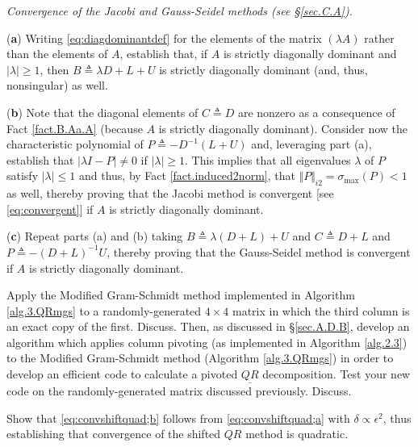 \begin{exercise} \label{ex.4.Jacobi.Gauss-Seidel} \rm {\it Convergence of the Jacobi and Gauss-Seidel methods (see \S \ref{sec.C.A}).}\vskip0.05in

\noindent ({\bf a}) Writing \eqref{eq:diagdominantdef} for the elements of the matrix $(\lambda A)$ rather than the elements of $A$,
establish that, if $A$ is strictly diagonally dominant and
$|\lambda|\ge 1$, then $B\triangleq \lambda D+L+U$ is strictly diagonally dominant (and, thus, nonsingular) as well.\vskip0.1in

\noindent ({\bf b}) Note that the diagonal elements of $C\triangleq D$ are nonzero as a consequence of Fact \ref{fact.B.Aa.A} (because $A$ is strictly diagonally dominant).
Consider now the characteristic polynomial of $P\triangleq -D^{-1}(L+U)$ and, leveraging part (a), establish that $|\lambda I - P|\ne 0$ if $|\lambda|\ge 1$.  This implies that all eigenvalues
$\lambda$ of $P$ satisfy $|\lambda|\le 1$ and thus, by Fact \ref{fact.induced2norm}, that $\Vert P\Vert_{i2} = \sigma_{\textrm{max}}(P)<1$ as well,
thereby proving that the Jacobi method is convergent [see \eqref{eq:convergent}] if $A$ is strictly diagonally dominant.\vskip0.1in

\noindent ({\bf c}) Repeat parts (a) and (b) taking $B\triangleq \lambda (D+L)+U$ and $C\triangleq D+L$ and $P\triangleq -(D+L)^{-1} U$,
thereby proving that the Gauss-Seidel method is convergent if $A$ is strictly diagonally dominant.
\end{exercise}

\begin{exercise} \label{ex:04.QRmgspivot} \rm Apply the Modified Gram-Schmidt method implemented in Algorithm \ref{alg.3.QRmgs} to a randomly-generated $4\times 4$ matrix in which the third column is an exact copy of the first.  Discuss.
Then, as discussed in \S \ref{sec.A.D.B}, develop an algorithm which applies column pivoting (as implemented in Algorithm \ref{alg.2.3}) to the Modified Gram-Schmidt method (Algorithm \ref{alg.3.QRmgs})
in order to develop an efficient code to calculate a pivoted $\underline{QR}$ decomposition.  Test your new code on the randomly-generated matrix discussed previously.  Discuss.
\end{exercise}

\begin{exercise} \label{ex:04.convshiftquad} \rm Show that \eqref{eq:convshiftquad;b} follows from \eqref{eq:convshiftquad;a} with $\delta \propto \epsilon^2$,
thus establishing that convergence of the shifted $QR$ method is quadratic.
\end{exercise}

